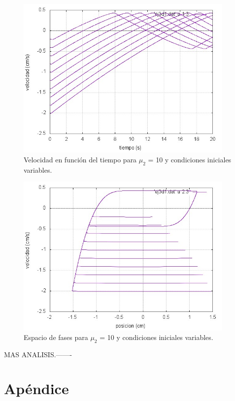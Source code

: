 \documentclass[a4paper,12pt]{article}
\begin{document}
\begin{itemize}
\begin{figure}[H]
\begin{center}
\includegraphics[height=8cm]{grafico_ej3d1_vVSt.jpg}
\caption[width=5cm]{Velocidad en funci\'on del tiempo para $\mu_2$ = 10 y condiciones iniciales variables.}
\end{center}
\end{figure}

\begin{figure}[H]
\begin{center}
\includegraphics[height=8cm]{grafico_ej3d1_xVSv.jpg}
\caption[width=5cm]{Espacio de fases para $\mu_2$ = 10 y condiciones iniciales variables.}
\end{center}
\end{figure}

MAS ANALISIS.-------


\end{itemize}

\section{Ap\'endice}
\end{document}
